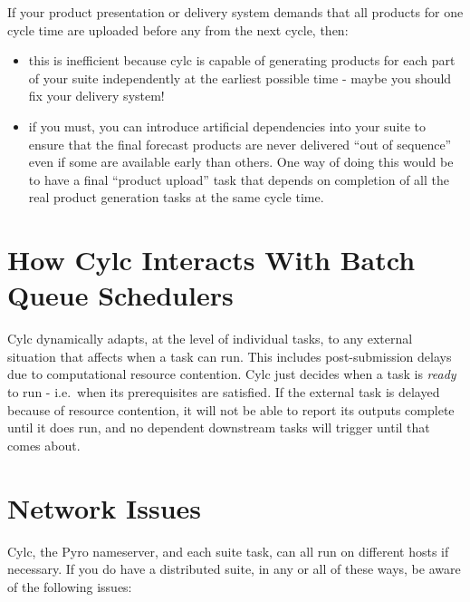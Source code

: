 \documentclass[11pt,a4paper]{article}
\begin{document}
If your product presentation or delivery system demands that all
products for one cycle time are uploaded before any from the next
cycle, then:

\begin{itemize}
    \item this is inefficient because cylc is capable of generating products 
        for each part of your suite independently at the earliest
        possible time - maybe you should fix your delivery system!
    \item if you must, you can introduce artificial dependencies into
        your suite to ensure that the final forecast products are never
        delivered ``out of sequence'' even if some are available early
        than others.  One way of doing this would be to have a final
        ``product upload'' task that depends on completion of all the
        real product generation tasks at the same cycle time.
\end{itemize}

\section{How Cylc Interacts With Batch Queue Schedulers}
\label{HowCylcInteractsWithBatchQueueSchedulers}

Cylc dynamically adapts, at the level of individual tasks, to any
external situation that affects when a task can run. This includes
post-submission delays due to computational resource contention. Cylc
just decides when a task is {\em ready} to run - i.e.\ when its
prerequisites are satisfied.  If the external task is delayed because of
resource contention, it will not be able to report its outputs complete
until it does run, and no dependent downstream tasks will trigger until
that comes about.



\section{Network Issues}

Cylc, the Pyro nameserver, and each suite task, can all run on
different hosts if necessary.  If you do have a distributed suite, in 
any or all of these ways, be aware of the following issues: 
\end{document}
